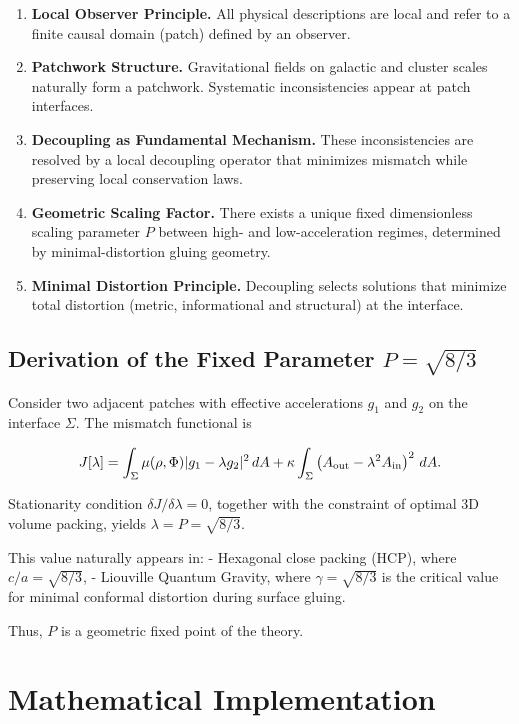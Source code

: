 \documentclass[12pt,a4paper]{article}
\begin{document}
\begin{enumerate}
\item \textbf{Local Observer Principle.} All physical descriptions are local and refer to a finite causal domain (patch) defined by an observer.
\item \textbf{Patchwork Structure.} Gravitational fields on galactic and cluster scales naturally form a patchwork. Systematic inconsistencies appear at patch interfaces.
\item \textbf{Decoupling as Fundamental Mechanism.} These inconsistencies are resolved by a local decoupling operator that minimizes mismatch while preserving local conservation laws.
\item \textbf{Geometric Scaling Factor.} There exists a unique fixed dimensionless scaling parameter \(P\) between high- and low-acceleration regimes, determined by minimal-distortion gluing geometry.
\item \textbf{Minimal Distortion Principle.} Decoupling selects solutions that minimize total distortion (metric, informational and structural) at the interface.
\end{enumerate}

\subsection{Derivation of the Fixed Parameter \( P = \sqrt{8/3} \)}

Consider two adjacent patches with effective accelerations \(g_1\) and \(g_2\) on the interface \(\Sigma\). The mismatch functional is

\begin{equation}
J[\lambda] = \int_{\Sigma} \mu(\rho,\Phi) |g_1 - \lambda g_2|^2 \, dA 
+ \kappa \int_{\Sigma} \left( A_{\rm out} - \lambda^2 A_{\rm in} \right)^2 \, dA.
\end{equation}

Stationarity condition \(\delta J/\delta\lambda = 0\), together with the constraint of optimal 3D volume packing, yields \(\lambda = P = \sqrt{8/3}\).

This value naturally appears in:
- Hexagonal close packing (HCP), where \(c/a = \sqrt{8/3}\),
- Liouville Quantum Gravity, where \(\gamma = \sqrt{8/3}\) is the critical value for minimal conformal distortion during surface gluing.

Thus, \(P\) is a geometric fixed point of the theory.

\section{Mathematical Implementation}
\end{document}

